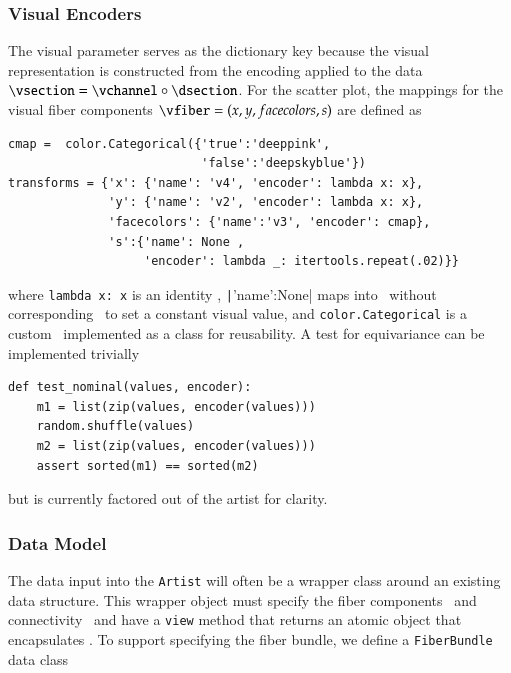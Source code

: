 \documentclass[journal]{vgtc}                %
\begin{document}
\subsubsection{Visual Encoders}
The visual parameter serves as the dictionary key because the visual representation is constructed from the encoding applied to the data  $\vsection = \vchannel \circ \dsection$. For the scatter plot, the mappings for the visual fiber components $\vfiber=(x,y, facecolors, s)$ are defined as
\begin{verbatim}
cmap =  color.Categorical({'true':'deeppink', 
                           'false':'deepskyblue'})
transforms = {'x': {'name': 'v4', 'encoder': lambda x: x},
              'y': {'name': 'v2', 'encoder': lambda x: x},
              'facecolors': {'name':'v3', 'encoder': cmap}, 
              's':{'name': None , 
                   'encoder': lambda _: itertools.repeat(.02)}}
\end{verbatim}

where \texttt{lambda x: x} is an identity \vchannel, \texttt|{'name':None}| maps into \vfiber\ without corresponding \dsection\ to set a constant visual value, and \texttt{color.Categorical} is a custom \vchannel\ implemented as a class for reusability.  A test for equivariance can be implemented trivially
\begin{verbatim}
def test_nominal(values, encoder):
    m1 = list(zip(values, encoder(values)))
    random.shuffle(values)
    m2 = list(zip(values, encoder(values)))
    assert sorted(m1) == sorted(m2)
\end{verbatim}
but is currently factored out of the artist for clarity. 

\subsubsection{Data Model}
The data input into the \texttt{Artist} will often be a wrapper class around an existing data structure. This wrapper object must specify the fiber components \dfiber\ and connectivity \dbase\ and have a \texttt{view} method that returns an atomic object that encapsulates \dsection. To support specifying the fiber bundle, we define a \texttt{FiberBundle} data class\cite{DataclassesDataClasses}
\end{document}
